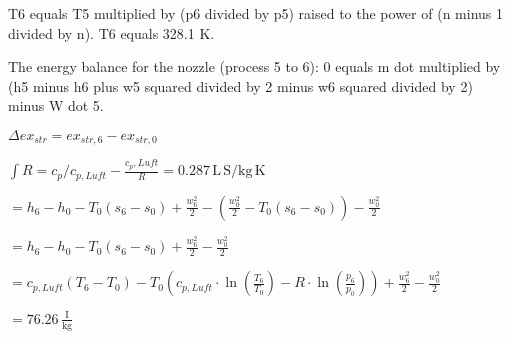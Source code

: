 T6 equals T5 multiplied by (p6 divided by p5) raised to the power of (n minus 1 divided by n).  
T6 equals 328.1 K.  

The energy balance for the nozzle (process 5 to 6):  
0 equals m dot multiplied by (h5 minus h6 plus w5 squared divided by 2 minus w6 squared divided by 2) minus W dot 5.

\( \Delta ex_{str} = ex_{str,6} - ex_{str,0} \)  

\( \int R = c_p / c_{p, Luft} - \frac{c_p, Luft}{R} = 0.287 \, \text{L} \, \text{S} / \text{kg} \, \text{K} \)  

\( = h_6 - h_0 - T_0 \left( s_6 - s_0 \right) + \frac{w_6^2}{2} - \left( \frac{w_0^2}{2} - T_0 \left( s_6 - s_0 \right) \right) - \frac{w_0^2}{2} \)  

\( = h_6 - h_0 - T_0 \left( s_6 - s_0 \right) + \frac{w_6^2}{2} - \frac{w_0^2}{2} \)  

\( = c_{p, Luft} \left( T_6 - T_0 \right) - T_0 \left( c_{p, Luft} \cdot \ln \left( \frac{T_6}{T_0} \right) - R \cdot \ln \left( \frac{p_6}{p_0} \right) \right) + \frac{w_6^2}{2} - \frac{w_0^2}{2} \)  

\( = 76.26 \, \frac{\text{I}}{\text{kg}} \)